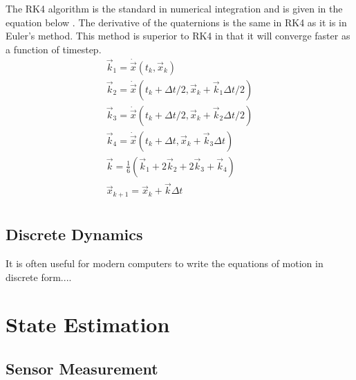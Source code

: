 The RK4 algorithm is the standard in numerical integration and is
given in the equation below \cite{Chapra_MEANALYSIS}. The derivative
of the quaternions is the same in RK4 as it is in Euler's method. This
method is superior to RK4 in that it will converge faster as a
function of timestep.
\begin{equation}
  \begin{matrix}
    \vec{k}_1 = \dot{\vec{x}}(t_k,\vec{x}_k)\\
    \vec{k}_2 = \dot{\vec{x}}(t_k+\Delta t/2,\vec{x}_k+\vec{k}_1\Delta t/2)\\
    \vec{k}_3 = \dot{\vec{x}}(t_k+\Delta t/2,\vec{x}_k+\vec{k}_2\Delta t/2)\\
    \vec{k}_4 = \dot{\vec{x}}(t_k+\Delta t,\vec{x}_k+\vec{k}_3\Delta t)\\
    \vec{k} = \frac{1}{6}(\vec{k}_1 + 2\vec{k}_2 + 2\vec{k}_3 + \vec{k}_4)\\
    \vec{x}_{k+1} = \vec{x}_k + \vec{k} \Delta t \\
  \end{matrix}
\end{equation}

\subsection{Discrete Dynamics}

It is often useful for modern computers to write the equations of
motion in discrete form....

\section{State Estimation}

\subsection{Sensor Measurement} \label{s:measurements}

